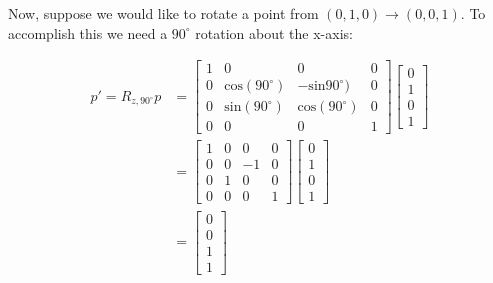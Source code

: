 \documentclass[12pt,letterpaper]{article}
\begin{document}
Now, suppose we would like to rotate a point from $(0, 1, 0) \rightarrow (0, 0, 1)$. To accomplish this we need a $90^{\circ}$ rotation about the x-axis:

\begin{equation}
    \begin{aligned}
    p' = R_{z, 90^{\circ}}p
    &= \begin{bmatrix}
        1 & 0 & 0 & 0 \\
        0 & \text{cos}(90^{\circ}) & -\text{sin}90^{\circ}) & 0 \\
        0 & \text{sin}(90^{\circ}) &  \text{cos}(90^{\circ}) & 0 \\
        0 & 0 & 0 & 1
    \end{bmatrix}
     \begin{bmatrix}
        0 \\
        1 \\
        0 \\
        1
    \end{bmatrix} \\
    &= \begin{bmatrix}
        1 & 0 &  0 & 0 \\
        0 & 0 & -1 & 0 \\
        0 & 1 &  0 & 0 \\
        0 & 0 &  0 & 1
    \end{bmatrix}
     \begin{bmatrix}
        0 \\
        1 \\
        0 \\
        1
    \end{bmatrix} \\
    &= \begin{bmatrix}
        0 \\
        0 \\
        1 \\
        1
    \end{bmatrix}
    \end{aligned}
\end{equation}
\end{document}
